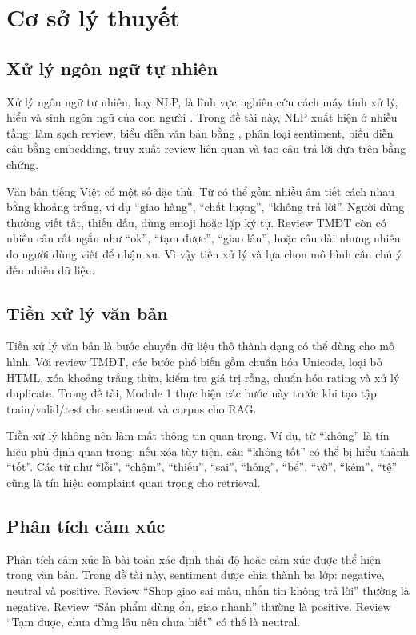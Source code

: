 \chapter{Cơ sở lý thuyết}
\section{Xử lý ngôn ngữ tự nhiên}
Xử lý ngôn ngữ tự nhiên, hay NLP, là lĩnh vực nghiên cứu cách máy tính xử lý, hiểu và sinh ngôn ngữ của con người \cite{jurafsky2023speech}. Trong đề tài này, NLP xuất hiện ở nhiều tầng: làm sạch review, biểu diễn văn bản bằng \TFIDF{}, phân loại sentiment, biểu diễn câu bằng embedding, truy xuất review liên quan và tạo câu trả lời dựa trên bằng chứng.

Văn bản tiếng Việt có một số đặc thù. Từ có thể gồm nhiều âm tiết cách nhau bằng khoảng trắng, ví dụ “giao hàng”, “chất lượng”, “không trả lời”. Người dùng thường viết tắt, thiếu dấu, dùng emoji hoặc lặp ký tự. Review TMĐT còn có nhiều câu rất ngắn như “ok”, “tạm được”, “giao lâu”, hoặc câu dài nhưng nhiễu do người dùng viết để nhận xu. Vì vậy tiền xử lý và lựa chọn mô hình cần chú ý đến nhiễu dữ liệu.

\section{Tiền xử lý văn bản}
Tiền xử lý văn bản là bước chuyển dữ liệu thô thành dạng có thể dùng cho mô hình. Với review TMĐT, các bước phổ biến gồm chuẩn hóa Unicode, loại bỏ HTML, xóa khoảng trắng thừa, kiểm tra giá trị rỗng, chuẩn hóa rating và xử lý duplicate. Trong đề tài, Module 1 thực hiện các bước này trước khi tạo tập train/valid/test cho sentiment và corpus cho RAG.

Tiền xử lý không nên làm mất thông tin quan trọng. Ví dụ, từ “không” là tín hiệu phủ định quan trọng; nếu xóa tùy tiện, câu “không tốt” có thể bị hiểu thành “tốt”. Các từ như “lỗi”, “chậm”, “thiếu”, “sai”, “hỏng”, “bể”, “vỡ”, “kém”, “tệ” cũng là tín hiệu complaint quan trọng cho retrieval.

\section{Phân tích cảm xúc}
Phân tích cảm xúc là bài toán xác định thái độ hoặc cảm xúc được thể hiện trong văn bản. Trong đề tài này, sentiment được chia thành ba lớp: negative, neutral và positive. Review “Shop giao sai màu, nhắn tin không trả lời” thường là negative. Review “Sản phẩm dùng ổn, giao nhanh” thường là positive. Review “Tạm được, chưa dùng lâu nên chưa biết” có thể là neutral.

